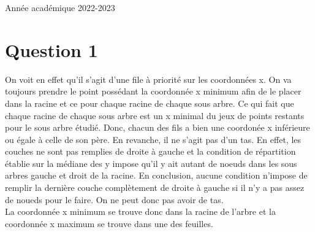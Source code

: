 \documentclass{article}
\begin{document}
\begin{titlepage}
\begin{center}
        {\large Année académique 2022-2023}
        
    \end{center}
\end{titlepage}

\tableofcontents

\newpage

\section{Question 1}
    On voit en effet qu'il s'agit d'une file à priorité sur les coordonnées x. On va toujours prendre le point possédant la coordonnée x minimum
    afin de le placer dans la racine et ce pour chaque racine de chaque sous arbre. Ce qui fait que chaque racine de chaque sous arbre est un x minimal du
    jeux de points restants pour le sous arbre étudié. Donc, chacun des fils a bien une coordonée x inférieure ou égale à celle de son père.
    En revanche, il ne s'agit pas d'un tas. En effet, les couches ne sont pas remplies de droite à gauche et la condition de répartition établie
    sur la médiane des y impose qu'il y ait autant de noeuds dans les sous arbres gauche et droit de la racine. En conclusion, aucune condition
    n'impose de remplir la dernière couche complètement de droite à gauche si il n'y a pas assez de noueds pour le faire. On ne peut donc pas avoir de tas.\\
    La coordonnée x minimum se trouve donc dans la racine de l'arbre et la 
    coordonnée x maximum se trouve dans une des feuilles.
\end{document}
